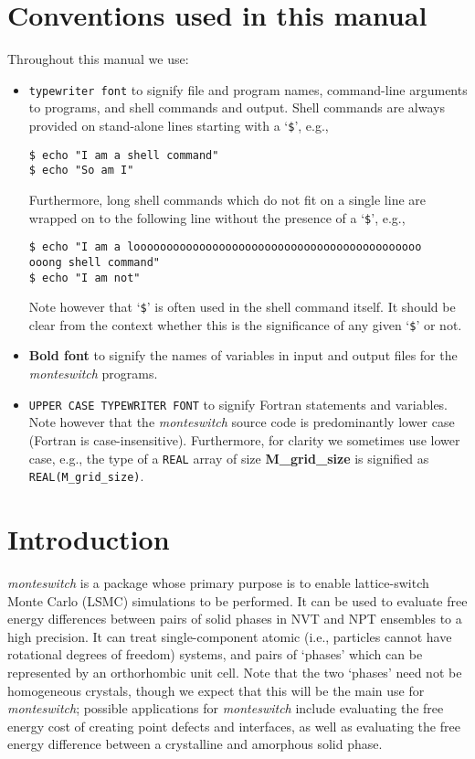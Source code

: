 \documentclass{report}
\begin{document}
\chapter*{Conventions used in this manual}
Throughout this manual we use:
\begin{itemize}
\item \texttt{typewriter font} to signify file and program names, command-line arguments to programs, and shell
commands and output. Shell commands are always provided on stand-alone lines starting with a `\verb|$|', e.g.,
\begin{verbatim}
$ echo "I am a shell command"
$ echo "So am I"
\end{verbatim}
Furthermore, long shell commands which do not fit on a single line are wrapped on to the following line without the presence of
a `\verb|$|', e.g.,
\begin{verbatim}
$ echo "I am a loooooooooooooooooooooooooooooooooooooooooooo
ooong shell command"
$ echo "I am not"
\end{verbatim}
Note however that `\verb|$|' is often used in the shell command itself. It should be clear from the context whether this is the
significance of any given `\verb|$|' or not.
\item \textbf{Bold font} to signify the names of variables in input and output files for the \emph{monteswitch} programs.
\item \texttt{UPPER CASE TYPEWRITER FONT} to signify Fortran statements and variables. Note however that the \emph{monteswitch} 
source code is predominantly lower case (Fortran is case-insensitive). Furthermore, for clarity we sometimes use lower case, e.g.,
the type of a \texttt{REAL} array of size \textbf{M\_grid\_size} is signified as \texttt{REAL(M\_grid\_size)}.
\end{itemize}


\chapter{Introduction}
\emph{monteswitch} is a package whose primary purpose is to enable lattice-switch Monte Carlo (LSMC) \cite{Bruce_1997,Bruce_2000}
simulations to be performed. 
%
It can be used to evaluate free energy differences between pairs of solid phases in NVT and NPT 
ensembles to a high precision. It can treat single-component atomic (i.e., particles cannot have rotational degrees of freedom) systems, and 
pairs of `phases' 
which can be represented by an orthorhombic unit cell. Note that the two `phases' need not be homogeneous crystals, though we expect that this
will be the main use for \emph{monteswitch}; possible applications for \emph{monteswitch} include evaluating the free energy cost of creating
point defects and interfaces, as well as evaluating the free energy difference between a crystalline and amorphous solid phase.
\end{document}
